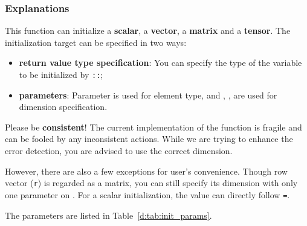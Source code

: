 \subsubsection*{Explanations}
This function can initialize a \textbf{scalar}, a \textbf{vector}, a \textbf{matrix} and a \textbf{tensor}.
The initialization target can be specified in two ways:
\begin{itemize}
  \item \textbf{return value type specification}: You can specify the type of the variable to be
  initialized by \texttt{::};
  \item \textbf{parameters}: Parameter  is used for element type,
  and , ,  are used for dimension specification.
\end{itemize}
\begin{warning}
  Please be \textbf{consistent}!
  The current implementation of the function is fragile and can be fooled by
  any inconsistent actions. While we are trying to enhance the error detection,
  you are advised to use the correct dimension.

  However, there are also a few exceptions for user's convenience.
  Though row vector (\texttt{r}) is regarded as a matrix,
  you can still specify its dimension with only one parameter on .
  For a scalar initialization, the value can directly follow \texttt{=}.
\end{warning}
The parameters are listed in Table~\ref{d:tab:init_params}.
